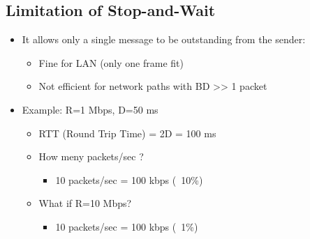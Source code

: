 \documentclass[12pt]{ctexart}   %
\begin{document}
	\subsection{Limitation of Stop-and-Wait}
	\begin{itemize}
		\item It allows only a single message to be outstanding from the sender:
		\begin{itemize}
			\item Fine for LAN (only one frame fit)
			\item Not efficient for network paths with BD >> 1 packet
		\end{itemize}
		
		\item Example: R=1 Mbps, D=50 ms
		\begin{itemize}
			\item RTT (Round Trip Time) = 2D = 100 ms
			\item How meny packets/sec ?
			\begin{itemize}
				\item 10 packets/sec = 100 kbps (~10\%)
			\end{itemize}
			\item What if R=10 Mbps?
			\begin{itemize}
				\item 10 packets/sec = 100 kbps (~1\%)
			\end{itemize}
		\end{itemize}
	\end{itemize}
	
\end{document}
